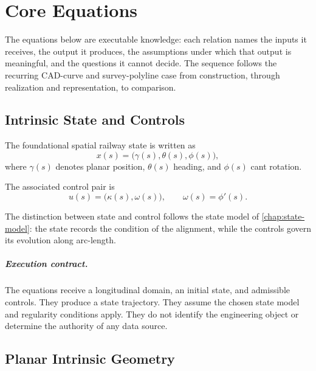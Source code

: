 
\chapter{Core Equations}
\label{chap:core-equations}

The equations below are executable knowledge: each relation names the
inputs it receives, the output it produces, the assumptions under which
that output is meaningful, and the questions it cannot decide. The
sequence follows the recurring CAD-curve and survey-polyline case from
construction, through realization and representation, to comparison.

\section{Intrinsic State and Controls}

The foundational spatial railway state is written as
\begin{equation}
x(s)
=
\bigl(\gamma(s),\theta(s),\phi(s)\bigr),
\label{eq:canonical-state}
\end{equation}
where \(\gamma(s)\) denotes planar position, \(\theta(s)\) heading, and
\(\phi(s)\) cant rotation.

The associated control pair is
\begin{equation}
u(s)
=
\bigl(\kappa(s),\omega(s)\bigr),
\qquad
\omega(s)=\phi'(s).
\label{eq:control-variables}
\end{equation}

The distinction between state and control follows the state model of
\cref{chap:state-model}: the state records the condition of the
alignment, while the controls govern its evolution along arc-length.

\paragraph{Execution contract.}
The equations receive a longitudinal domain, an initial state, and
admissible controls. They produce a state trajectory. They assume the
chosen state model and regularity conditions apply. They do not identify
the engineering object or determine the authority of any data source.

\section{Planar Intrinsic Geometry}

